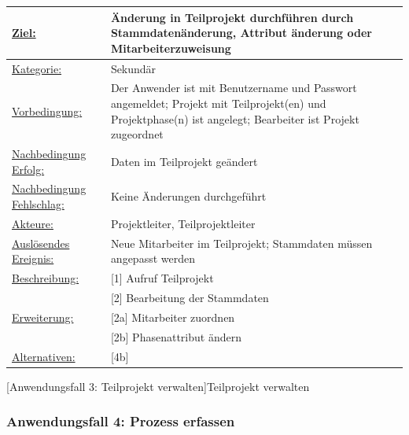 \label{tab:UC3}
\begin{tabularx}{\textwidth}{|p{}|p{}|}
        \hline
        \underline{Ziel:} & Änderung in Teilprojekt durchführen durch Stammdatenänderung, Attribut änderung oder Mitarbeiterzuweisung \\\hline
        \underline{Kategorie:} & Sekundär\\\hline
        \underline{Vorbedingung:} & Der Anwender ist mit Benutzername und Passwort angemeldet; Projekt mit Teilprojekt(en) und Projektphase(n) ist angelegt; Bearbeiter ist Projekt zugeordnet\\\hline
        \underline{Nachbedingung Erfolg:} & Daten im Teilprojekt geändert \\\hline
        \underline{Nachbedingung Fehlschlag:} & Keine Änderungen durchgeführt \\\hline
        \underline{Akteure:} & Projektleiter, Teilprojektleiter \\\hline
        \underline{Auslösendes Ereignis:} & Neue Mitarbeiter im Teilprojekt; Stammdaten müssen angepasst werden\\\hline        
        \multirow{1}{*}{\underline{Beschreibung:}} & [1] Aufruf Teilprojekt\\
        & [2] Bearbeitung der Stammdaten\\\hline
        \multirow{1}{*}{\underline{Erweiterung:}} & [2a] Mitarbeiter zuordnen\\
        & [2b] Phasenattribut ändern\\\hline
        \underline{Alternativen:} & [4b]  \\\hline
\end{tabularx}
[Anwendungsfall 3: Teilprojekt verwalten]{Teilprojekt verwalten}


\newpage
\subsubsection{Anwendungsfall 4: Prozess erfassen}

